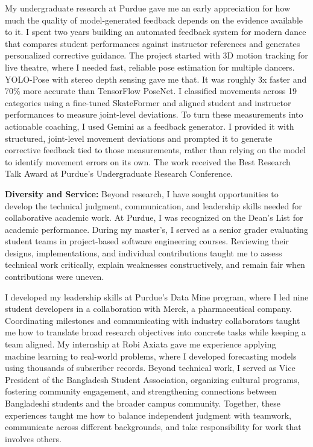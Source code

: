 \documentclass{article}
\begin{document}
My undergraduate research at Purdue gave me an early appreciation for how much the quality of model-generated feedback depends on the evidence available to it. I spent two years building an automated feedback system for modern dance that compares student performances against instructor references and generates personalized corrective guidance. The project started with 3D motion tracking for live theatre, where I needed fast, reliable pose estimation for multiple dancers. YOLO-Pose with stereo depth sensing gave me that. It was roughly 3x faster and 70\% more accurate than TensorFlow PoseNet. I classified movements across 19 categories using a fine-tuned SkateFormer and aligned student and instructor performances to measure joint-level deviations. To turn these measurements into actionable coaching, I used Gemini as a feedback generator. I provided it with structured, joint-level movement deviations and prompted it to generate corrective feedback tied to those measurements, rather than relying on the model to identify movement errors on its own. The work received the Best Research Talk Award at Purdue's Undergraduate Research Conference.

\textbf{Diversity and Service: }Beyond research, I have sought opportunities to develop the technical judgment, communication, and leadership skills needed for collaborative academic work. At Purdue, I was recognized on the Dean's List for academic performance. During my master's, I served as a senior grader evaluating student teams in project-based software engineering courses. Reviewing their designs, implementations, and individual contributions taught me to assess technical work critically, explain weaknesses constructively, and remain fair when contributions were uneven.

I developed my leadership skills at Purdue's Data Mine program, where I led nine student developers in a collaboration with Merck, a pharmaceutical company. Coordinating milestones and communicating with industry collaborators taught me how to translate broad research objectives into concrete tasks while keeping a team aligned. My internship at Robi Axiata gave me experience applying machine learning to real-world problems, where I developed forecasting models using thousands of subscriber records. Beyond technical work, I served as Vice President of the Bangladesh Student Association, organizing cultural programs, fostering community engagement, and strengthening connections between Bangladeshi students and the broader campus community. Together, these experiences taught me how to balance independent judgment with teamwork, communicate across different backgrounds, and take responsibility for work that involves others.
\end{document}
